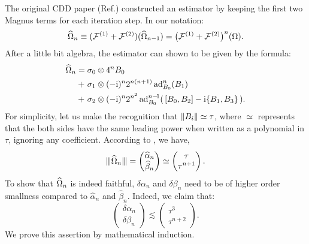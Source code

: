 \documentclass[pra,reprint,superscriptaddress]{revtex4-2}
\begin{document}
The original CDD paper (Ref.\cite{khodjasteh2005fault}) constructed an estimator by keeping the first two Magnus terms for each iteration step. In
our notation:
\begin{equation}\label{eq:estimator-trunc}
    \widehat{\Omega}_{n} \equiv (
    \mathcal{F}^{(1)} + 
    \mathcal{F}^{(2)}) (\widehat{\Omega}_{n-1}) = \big(
    \mathcal{F}^{(1)} + 
    \mathcal{F}^{(2)}\big)^n (\Omega).
\end{equation}
After a little bit algebra, the estimator can shown to be given by the formula:
\begin{align}\label{eq:cdd-estimator}
\widehat{\Omega}_{n} 
={} & \sigma_0 \otimes 4^n B_0 \notag \\
+\ & \sigma_1 \otimes (-\mathrm{i})^{n} 2^{n(n+1)} \operatorname{ad}_{B_0}^{n}(B_1)\\ 
+\ & \sigma_2 \otimes (-\mathrm{i})^{n} 2^{n^2} \operatorname{ad}_{B_0}^{n-\!1}( \,[B_0,B_2] - \mathrm{i} \{B_1,B_3\} \,). \notag
\end{align} 
 For simplicity, let us make the recognition that $\Vert {B_i} \Vert\simeq\tau$, where $\simeq$ represents that the both sides have the same leading power when written as a polynomial in $\tau$, ignoring any coefficient.
According to , we have,
\begin{equation}
\opnorm{\Ohat_{n}} =
\begin{pmatrix}
\widehat\alpha_{n}\\
\widehat\beta_{n}
\end{pmatrix}
\simeq
\begin{pmatrix}
\tau\\
\tau^{n+1}
\end{pmatrix}.
\end{equation}
To show that $\widehat{\Omega}_{n}$ is indeed faithful, $\delta\alpha_{n}$ and $\delta\beta_{n}$ need to be of higher order smallness compared to $\widehat\alpha_{n}$ and $\widehat\beta_{n}$. Indeed, we claim that:
\begin{equation}\label{eq:cdd-error-bounds}
\begin{pmatrix}
\delta\alpha_{n}\\
\delta\beta_{n} 
\end{pmatrix}
\lesssim
\begin{pmatrix}
\tau^3\\
\tau^{n+2} 
\end{pmatrix}.
\end{equation}
We prove this assertion by mathematical induction.
\end{document}
